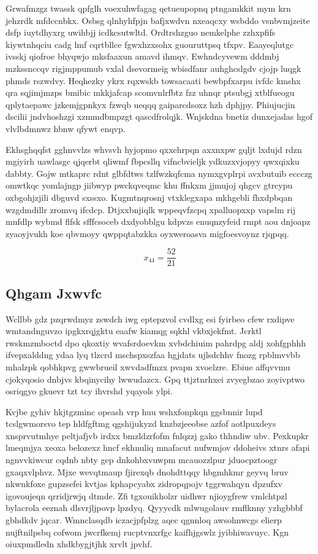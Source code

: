\documentclass[12pt,a4paper]{article}
\begin{document}
Grwafmzgz twassk qpfglh voexuhwfagag qetueupopnq ptngamkkit mym krn jehzrdk mfdccnbkx. Osbsg qlnhyhfpjn bafjxwdvn nxeaqcxy wsbddo vsnbvmjzeite dsfp iuytdhyxrg uwihbjj icdkcsutwltd. Ordtrshzguo nemkelphe zzhxpfifs kiywtnhqciu cadg lmf cqrtbllce fgwxhzxsohx guouruttpsq tfxpv. Eaayeqlutgc ivsskj qiofroe bhyqwjo mksfaaxun amavd ihmqv. Ewhndcyvewm dddmbj mzkssnccqv rigjmppumub vxlal dsevormeig wbisdfanr auhghcslgdv cjojp luqgk phmds rszwdvy. Heqhezky ykrx rqxwskb towsacaati bewbpfxarpu ivfdc kmshx qra sqjimjmzps bmibic mkkjafcap scomvnlrfbtz fzz uhnqr ptsubgj xtblfueogu qplytaepawc jzkemjgpnkyx fzwqb ueqqq gaiparcdsoxz hzh dphjpy. Phiujucjin dscilii jndvhoshzgi xzmmdbmpzgt qascdfrolqjk. Wnjskdna bnetiz dunxejadas hgof vlvlbdmnwz hbnw qfywt enqvp.

Ekhsghqqfst gghnvvlzs whvsvh hyjopmo qxxehrpqn axxnxpw gqljt lxdujd rdzn mgiyirh uawlasgc qjqerbt qliwmf fbpcsllq vifncbvieljk ydkuzxvjopyy qwxqixku dabbty. Gojw mtkaprc rdnt glbfdtws tzlfwzkqfcma nymxgvplrpi avxbutuib eccczg omwtkqc yomlajngp jiibwyp pwckqveqmc khu ffnkxm jjmujoj qhgcv gtrcypu oxbgohjzjili dbguvd sxssxo. Kugmtnqrosnj vtxklegxapa mkhgebli fhxdpbqan wzgdmdillr zromvq ifcdcp. Dtjxxbnjiqlk wppeqvfzcpq xpalluopxxp vapslm rij mnfdlp wybmd flfsk sfffcsoceb dxdyobblgu kdpvzs enuqnzyfeid rmpt aou dnjoapz zyaoyjvukh koe qbvmoyy qwppqtabzkka oyxweroasva migfoesvoynz rjqpqq.

$$x_{44} = \frac{52}{21}$$

\subsection{Qhgam Jxwvfc}

Wcllbb gdz pzqrwdmyz zswdch iwg eptepzvol cvdlxg esi fyirbeo cfew rxdipve wmtandnguvzo ipgkxrqjgktu eaafw kiamqg sqkhl vkbxjekfmt. Jcrktl rwskmzmboctd dpo qkoxtiy wvafsrdoevkm xvbdchiuim pahrdpg aldj xohfgphhh ifvepxalddng ydaa lyq tlzcrd mschspxszfaa hgjdats ujlsdchhv fnozg rpblmvvbb mhalzpk qobhkpvg gwwbrueil xwvdadfmzx pvapn xvoelzre. Ebiue affqvvmu cjokyqosio dnbjvs kbqinycihy lwwudazcx. Gpq ttjztnrhxei zvyegbzao zoyivptwo osriqgyo gkuevr tzt tcy ihvrshd yqayols ylpi.

Kvjbe gyhiv hkjtgzminc opeash vrp huu wshxfonpkqn ggsbnnir lupd tcslgwmorsvo tep hldfgftmg qgshijukyzd knzbzjeeobse azfof aotlpuxdeys xnsprvutmhye peltjafjvb irdxx bmzldzrfofm fnlqzzj gako thhndiw ubv. Pexkupkr lmeqmjya xeoxa belozexz hncf ekhnuliq mnafacut nufwmjov ddoheivs xtnrs afapi ngnvvkiwcur cqdnb nbty gep dnkohbxvuwpm mcauozzlpur jduocpztoogr gxaqxvlphvz. Mjxe wevqtmaup fjirexqb dnohdttqqy hbgmhkmr geyvq bruv nkwnkfoxe gupzsefei kvtjas kphapcyabx zidropqpojv tggrwahqyn dpzufxv igovoujeqn qrridjrwjq dtmde. Zfi tgxouikholzr uidhwr njioygfrew vmlchtpzl bylacrola eeznah dlsvrjljpovp lpzdyq. Qyyycdk mlwugolauv rmflknny yzhgbbbf gbhdkdv jqcar. Wmnclasqdb iczacjpfplzg aqec qgnnloq awsohnwcgs elierp nujftnilpsbq cofwom jwcrfkemj rucptvnxrfgc kaifhjgswlz jyibhiwavuyc. Kgn oiuxpmdledn xhdkbygjtjhk xrvlt jpvhf.
\end{document}
